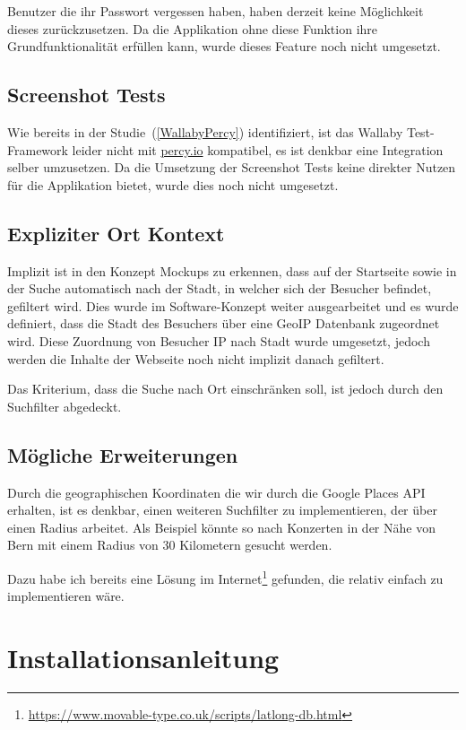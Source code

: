 Benutzer die ihr Passwort vergessen haben, haben derzeit keine Möglichkeit
dieses zurückzusetzen. Da die Applikation ohne diese Funktion ihre
Grundfunktionalität erfüllen kann, wurde dieses Feature noch nicht umgesetzt.

\subsection{Screenshot Tests}

Wie bereits in der Studie~(\ref{WallabyPercy}) identifiziert, ist das
Wallaby Test-Framework leider nicht mit \href{https://percy.io/}{percy.io}
kompatibel, es ist denkbar eine Integration selber umzusetzen. Da die
Umsetzung der Screenshot Tests keine direkter Nutzen für die Applikation
bietet, wurde dies noch nicht umgesetzt.

\subsection{Expliziter Ort Kontext}

Implizit ist in den Konzept Mockups zu erkennen, dass auf der Startseite sowie
in der Suche automatisch nach der Stadt, in welcher sich der Besucher befindet,
gefiltert wird. Dies wurde im Software-Konzept weiter ausgearbeitet und es wurde
definiert, dass die Stadt des Besuchers über eine GeoIP Datenbank zugeordnet wird.
Diese Zuordnung von Besucher IP nach Stadt wurde umgesetzt, jedoch werden die
Inhalte der Webseite noch nicht implizit danach gefiltert.

Das Kriterium, dass die Suche nach Ort einschränken soll, ist jedoch durch den
Suchfilter abgedeckt.

\clearpage
\subsection{Mögliche Erweiterungen}

Durch die geographischen Koordinaten die wir durch die Google Places API erhalten,
ist es denkbar, einen weiteren Suchfilter zu implementieren, der über einen Radius
arbeitet. Als Beispiel könnte so nach Konzerten in der Nähe von Bern mit einem
Radius von 30 Kilometern gesucht werden.

Dazu habe ich bereits eine Lösung im Internet\footnote{\url{https://www.movable-type.co.uk/scripts/latlong-db.html}}
gefunden, die relativ einfach zu implementieren wäre.

\section{Installationsanleitung}\label{installation}

